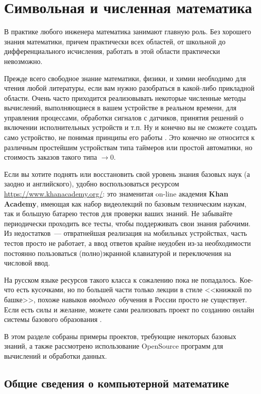 \part{Символьная и численная математика}

В практике любого инженера математика занимают главную роль. Без хорошего знания
математики, причем практически всех областей, от школьной до дифференциального
исчисления, работать в этой области практически невозможно.

Прежде всего свободное знание математики, физики, и химии необходимо для чтения
любой литературы, если вам нужно разобраться в какой-либо прикладной области.
Очень часто приходится реализовывать некоторые численные методы вычислений,
выполняющиеся в вашем устройстве в реальном времени, для управления процессами,
обработки сигналов с датчиков, принятия решений о включении исполнительных
устройств и т.п. Ну и конечно вы не сможете создать само устройство, не понимая
принципы его работы \smiley. Это конечно не относится к различным простейшим
устройствам типа таймеров или простой автоматики, но стоимость заказов такого
типа $\rightarrow 0$.

Если вы хотите поднять или восстановить свой уровень знания базовых наук (а
заодно и английского), удобно воспользоваться ресурсом
\url{https://www.khanacademy.org/}: это знаменитая on-line академия \textbf{Khan
Academy}, имеющая как набор видеолекций по базовым техническим наукам, так и
большую батарею тестов для проверки ваших знаний. Не забывайте периодически
проходить все тесты, чтобы поддерживать свои знания рабочими. Из недостатков\
--- отвратнейшая реализация на мобильных устройствах, часть тестов просто не
работает, а ввод ответов крайне неудобен из-за необходимости постоянно
пользоваться (полно)экранной клавиатурой и переключения на числовой ввод.

На русском языке ресурсов такого класса к сожалению пока не попадалось.
Кое-что есть кусочками, но по большей части только лекции в стиле <<книжкой по
башке>>, похоже навыков \emph{вводного}\ обучения в России просто не существует.
Если есть силы и желание, можете сами реализовать проект по созданию онлайн
системы базового образования \smiley.

\bigskip
В этом разделе собраны примеры проектов, требующие некоторых базовых знаний, а
также рассмотрено использование OpenSource программ для вычислений и обработки
данных.
\clearpage

\chapter{Общие сведения о компьютерной математике}

